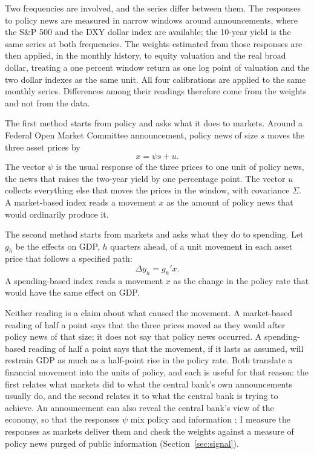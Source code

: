 Two frequencies are involved, and the series differ between them. The responses to policy news are measured in narrow windows around announcements, where the S\&P 500 and the DXY dollar index are available; the 10-year yield is the same series at both frequencies. The weights estimated from those responses are then applied, in the monthly history, to equity valuation and the real broad dollar, treating a one percent window return as one log point of valuation and the two dollar indexes as the same unit. All four calibrations are applied to the same monthly series. Differences among their readings therefore come from the weights and not from the data.

The first method starts from policy and asks what it does to markets. Around a Federal Open Market Committee announcement, policy news of size $s$ moves the three asset prices by
\begin{equation}\label{eq:decomp}
x=\psi s+u .
\end{equation}
The vector $\psi$ is the usual response of the three prices to one unit of policy news, the news that raises the two-year yield by one percentage point. The vector $u$ collects everything else that moves the prices in the window, with covariance $\Sigma$. A market-based index reads a movement $x$ as the amount of policy news that would ordinarily produce it.

The second method starts from markets and asks what they do to spending. Let $g_h$ be the effects on GDP, $h$ quarters ahead, of a unit movement in each asset price that follows a specified path:
\begin{equation}\label{eq:spend}
\Delta y_h=g_h'x .
\end{equation}
A spending-based index reads a movement $x$ as the change in the policy rate that would have the same effect on GDP.

Neither reading is a claim about what caused the movement. A market-based reading of half a point says that the three prices moved as they would after policy news of that size; it does not say that policy news occurred. A spending-based reading of half a point says that the movement, if it lasts as assumed, will restrain GDP as much as a half-point rise in the policy rate. Both translate a financial movement into the units of policy, and each is useful for that reason: the first relates what markets did to what the central bank's own announcements usually do, and the second relates it to what the central bank is trying to achieve. An announcement can also reveal the central bank's view of the economy, so that the responses $\psi$ mix policy and information \citep{nakamura2018}; I measure the responses as markets deliver them and check the weights against a measure of policy news purged of public information (Section~\ref{sec:signal}).

